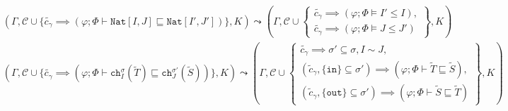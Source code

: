 \begin{table*}[!ht]
    \begin{framed}\vspace{-1em}\begin{align*}
        &(\Gamma,\mathcal{C} \cup \{ \widetilde{c_\gamma} \implies (\varphi;\Phi\vdash \texttt{Nat}[I,J] \sqsubseteq \texttt{Nat}[I',J'])\},K) \leadsto (\Gamma,\mathcal{C}\cup\left\{
        \begin{matrix}
        \widetilde{c_\gamma} \implies (\varphi;\Phi\vDash I' \leq I), \\ \widetilde{c_\gamma} \implies (\varphi;\Phi\vDash J \leq J')
        \end{matrix}\right\},K)\\
        &(\Gamma,\mathcal{C} \cup \{\widetilde{c_\gamma} \implies (\varphi;\Phi\vdash \texttt{ch}^\sigma_I(\widetilde{T}) \sqsubseteq \texttt{ch}^{\sigma'}_J(\widetilde{S}))\},K) \leadsto (\Gamma,\mathcal{C} \cup \left\{
        \begin{matrix}
        \widetilde{c_\gamma} \implies \sigma' \subseteq \sigma, I \sim J,\\
        (\widetilde{c}_\gamma, \{\texttt{in}\} \subseteq \sigma') \implies (\varphi;\Phi\vdash \widetilde{T}\sqsubseteq \widetilde{S}),\\
        (\widetilde{c}_\gamma,\{\texttt{out}\} \subseteq \sigma') \implies (\varphi;\Phi\vdash \widetilde{S}\sqsubseteq \widetilde{T})%
        \end{matrix}\right\},K)\\

\end{align*}
\end{framed}
\end{table*}
